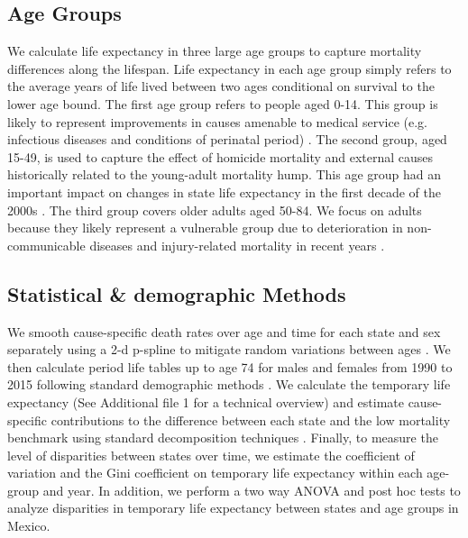 \documentclass{bmcart}
\begin{document}

\subsection*{Age Groups}

We calculate life expectancy in three large age groups to capture mortality differences along the lifespan. Life expectancy in each age group simply refers to the average years of life lived between two ages conditional on survival to the lower age bound. The first age group refers to people aged 0-14. This group is likely to represent improvements in causes amenable to medical service (e.g. infectious diseases and conditions of perinatal period) \cite{canudas2014}. The second group, aged 15-49, is used to capture the effect of homicide mortality and external causes historically related to the young-adult mortality hump. This age group had an important impact on changes in state life expectancy in the first decade of the 2000s \cite{Aburto2015}. The third group covers older adults aged 50-84. We focus on adults because they likely represent a vulnerable group due to deterioration in non-communicable diseases and injury-related mortality in recent years \cite{gonzalez2011health,gomez2016dissonant}.

\subsection*{Statistical \& demographic Methods}
We smooth cause-specific death rates over age and time for each
state and sex separately using a 2-d p-spline
to mitigate random variations between ages \cite{GC2012}. We then calculate period life tables up to
age 74 for males and females from 1990 to 2015 following standard demographic methods \cite{HMDMP}. We calculate the temporary life expectancy \cite{arriaga1984} (See Additional file 1 for a technical overview) and estimate cause-specific contributions to the difference between
each state and the low mortality benchmark using
 standard decomposition techniques \cite{horiuchi2008}. Finally, to measure the level of disparities between states over time, we estimate the coefficient of variation and the Gini coefficient on temporary life expectancy within each age-group and year. In addition, we perform a two way ANOVA and post hoc tests to analyze disparities in temporary life expectancy between states and age groups in Mexico. 
\end{document}
